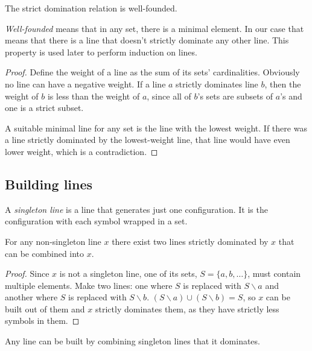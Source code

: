 \documentclass[english, 12pt, a4paper, sci, a-1b, online]{aaltothesis}
\begin{document}
\begin{lemma}\label{wfproof}
The strict domination relation is well-founded.
\end{lemma}

\emph{Well-founded} means that in any set, there is a minimal element. In our case that means that there is a line that doesn't strictly dominate any other line. This property is used later to perform induction on lines.

\begin{proof}
Define the weight of a line as the sum of its sets' cardinalities. Obviously no line can have a negative weight. If a line $a$ strictly dominates line $b$, then the weight of $b$ is less than the weight of $a$, since all of $b$'s sets are subsets of $a$'s and one is a strict subset.

A suitable minimal line for any set is the line with the lowest weight. If there was a line strictly dominated by the lowest-weight line, that line would have even lower weight, which is a contradiction.
\end{proof}

\subsection{Building lines}

A \emph{singleton line} is a line that generates just one configuration. It is the configuration with each symbol wrapped in a set.

\begin{lemma}\label{linesplit}
For any non-singleton line $x$ there exist two lines strictly dominated by $x$ that can be combined into $x$.
\end{lemma}

\begin{proof}
Since $x$ is not a singleton line, one of its sets, $S = \{a, b, \dots\}$, must contain multiple elements. Make two lines: one where $S$ is replaced with $S \smallsetminus a$ and another where $S$ is replaced with $S \smallsetminus b$. $(S \smallsetminus a) \cup (S \smallsetminus b) = S$, so $x$ can be built out of them and $x$ strictly dominates them, as they have strictly less symbols in them.
\end{proof}

\begin{theorem}\label{explode}
Any line can be built by combining singleton lines that it dominates.
\end{theorem}
\end{document}
